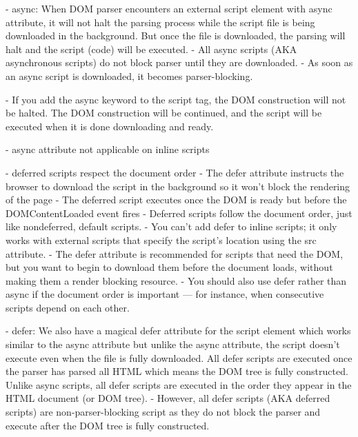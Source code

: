 - async:
When DOM parser encounters an external script element with async attribute, it will not halt the parsing process while the script file is being downloaded in the background. But once the file is downloaded, the parsing will halt and the script (code) will be executed.
- All async scripts (AKA asynchronous scripts) do not block parser until they are downloaded. 
- As soon as an async script is downloaded, it becomes parser-blocking. 


- If you add the async keyword to the script tag, the DOM construction will not be halted. The DOM construction will be continued, and the script will be executed when it is done downloading and ready.



- async attribute not applicable on inline scripts %




-  deferred scripts respect the document order
- The defer attribute instructs the browser to download the script in the background so it won’t block the rendering of the page
- The deferred script executes once the DOM is ready but before the DOMContentLoaded event fires
- Deferred scripts follow the document order, just like nondeferred, default scripts.
- You can’t add defer to inline scripts; it only works with external scripts that specify the script’s location using the src attribute.
- The defer attribute is recommended for scripts that need the DOM, but you want to begin to download them before the document loads, without making them a render blocking resource.
- You should also use defer rather than async if the document order is important — for instance, when consecutive scripts depend on each other.


- defer:
We also have a magical defer attribute for the script element which works similar to the async attribute but unlike the async attribute, the script doesn’t execute even when the file is fully downloaded. All defer scripts are executed once the parser has parsed all HTML which means the DOM tree is fully constructed. Unlike async scripts, all defer scripts are executed in the order they appear in the HTML document (or DOM tree).
- However, all defer scripts (AKA deferred scripts) are non-parser-blocking script as they do not block the parser and execute after the DOM tree is fully constructed.






